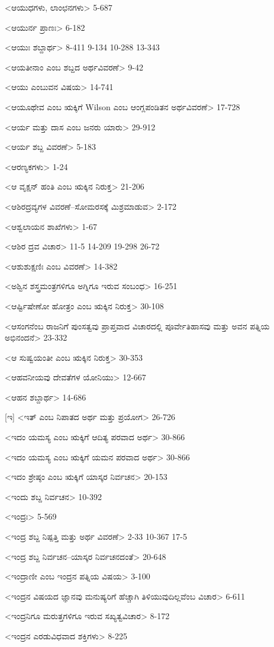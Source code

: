 <ಆಯುಧಗಳು, ಲಾಂಛನಗಳು>
5-687

<ಆಯುರ್ನ ಪ್ರಾಣಃ>
6-182


<ಆಯುಃ ಶಬ್ದಾರ್ಥ>
8-411 
9-134 
10-288 
13-343

<ಆಯತೀನಾಂ ಎಂಬ ಶಬ್ದದ ಅರ್ಥವಿವರಣೆ>
9-42

<ಆಯು ಎಂಬುವನ ವಿಷಯ>
14-741

<ಆಯೂಥೇವ ಎಂಬ ಋಕ್ಕಿಗೆ Wilson ಎಂಬ ಆಂಗ್ಲಪಂಡಿತನ ಅರ್ಥವಿವರಣೆ>
17-728

<ಆರ್ಯ ಮತ್ತು ದಾಸ ಎಂಬ ಜನರು ಯಾರು>
29-912

<ಆರ್ಯ ಶಬ್ದ ವಿವರಣೆ>
5-183

<ಆರಣ್ಯಕಗಳು>
1-24

<ಆ ವೃಕ್ಷನ್‍ ಹಂತಿ ಎಂಬ ಋಕ್ಕಿನ ನಿರುಕ್ತ>
21-206

<ಆಶಿರದ್ರವ್ಯಗಳ ವಿವರಣೆ–ಸೋಮರಸಕ್ಕೆ ಮಿಶ್ರಮಾಡುವ>
2-172

<ಆಶ್ವಲಾಯನ ಶಾಖೆಗಳು>
1-67

<ಆಶಿರ ದ್ರವ ವಿಚಾರ>
11-5 
14-209 
19-298
26-72

<ಆಶುಶುಕ್ಷಣಿಃ ಎಂಬ ವಿವರಣೆ>
14-382

<ಅಶ್ವಿನ ಶಸ್ತ್ರಮಂತ್ರಗಳಿಗೂ ಅಗ್ನಿಗೂ ಇರುವ ಸಂಬಂಧ>
16-251

<ಆರ್ಷ್ಟಿಷೇಣೋ ಹೋತ್ರಂ ಎಂಬ ಋಕ್ಕಿನ ನಿರುಕ್ತ>
30-108

<ಆಸಂಗನೆಂಬ ರಾಜನಿಗೆ ಪುಂಸತ್ವವು ಪ್ರಾಪ್ತವಾದ ವಿಚಾರದಲ್ಲಿ ಪೂರ್ವೇತಿಹಾಸವು ಮತ್ತು ಅವನ ಪತ್ನಿಯ ಅಭಿನಂದನೆ>
23-332

<ಆ ಸುಷ್ವಯಂತೀ ಎಂಬ ಋಕ್ಕಿನ ನಿರುಕ್ತ>
30-353

<ಆಹವನೀಯವು ದೇವತೆಗಳ ಯೋನಿಯು>
12-667

<ಆಹನ ಶಬ್ದಾರ್ಥ>
14-686

[ಇ]
<ಇತ್‍ ಎಂಬ ನಿಪಾತದ ಅರ್ಥ ಮತ್ತು ಪ್ರಯೋಗ>
26-726

<ಇದಂ ಯಮಸ್ಯ ಎಂಬ ಋಕ್ಕಿಗೆ ಆದಿತ್ಯ ಪರವಾದ ಅರ್ಥ>
30-866

<ಇದಂ ಯಮಸ್ಯ ಎಂಬ ಋಕ್ಕಿಗೆ ಯಮನ ಪರವಾದ ಅರ್ಥ>
30-866

<ಇದಂ ಶ್ರೇಷ್ಠಂ ಎಂಬ ಋಕ್ಕಿಗೆ ಯಾಸ್ಕರ ನಿರ್ವಚನ>
20-153

<ಇಂದು ಶಬ್ದ ನಿರ್ವಚನ>
10-392

<ಇಂದ್ರಃ>
5-569

<ಇಂದ್ರ ಶಬ್ದ ನಿಷ್ಪತ್ತಿ ಮತ್ತು ಅರ್ಥ ವಿವರಣೆ>
2-33 
10-367
17-5

<ಇಂದ್ರ ಶಬ್ದ ನಿರ್ವಚನ–ಯಾಸ್ಕರ ನಿರ್ವಚನದಂತೆ>
20-648

<ಇಂದ್ರಾಣೀ ಎಂಬ ಇಂದ್ರನ ಪತ್ನಿಯ ವಿಷಯ>
3-100

<ಇಂದ್ರನ ವಿಷಯದ ಜ್ಞಾನವು ಮನುಷ್ಯರಿಗೆ ಹೆಚ್ಚಾಗಿ ತಿಳಿಯುವುದಿಲ್ಲವೆಂಬ ವಿಚಾರ>
6-611

<ಇಂದ್ರನಿಗೂ ಮರುತ್ತಗಳಿಗೂ ಇರುವ ಸಖ್ಯತ್ವವಿಚಾರ>
8-172

<ಇಂದ್ರನ ಎರಡುವಿಧವಾದ ಶಕ್ತಿಗಳು>
8-225

